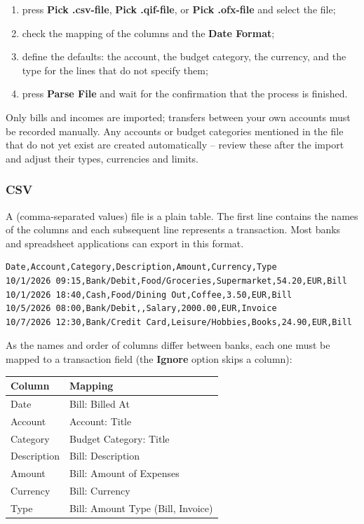 \begin{enumerate}
  \item press \textbf{Pick .csv-file}, \textbf{Pick .qif-file}, or \textbf{Pick .ofx-file}
  and select the file;
  \item check the mapping of the columns and the \textbf{Date Format};
  \item define the defaults: the account, the budget category, the currency, and the type for
  the lines that do not specify them;
  \item press \textbf{Parse File} and wait for the confirmation that the process is finished.
\end{enumerate}

\noindent Only bills and incomes are imported; transfers between your own accounts must be
recorded manually. Any accounts or budget categories mentioned in the file that do not yet
exist are created automatically -- review these after the import and adjust their types,
currencies and limits.

\subsubsection{CSV}

A  (comma-separated values) file is a plain table. The first line contains the names
of the columns and each subsequent line represents a transaction. Most banks and spreadsheet
applications can export in this format.

\begin{lstlisting}[caption=Sample CSV File, label=code:import-csv]
Date,Account,Category,Description,Amount,Currency,Type
10/1/2026 09:15,Bank/Debit,Food/Groceries,Supermarket,54.20,EUR,Bill
10/1/2026 18:40,Cash,Food/Dining Out,Coffee,3.50,EUR,Bill
10/5/2026 08:00,Bank/Debit,,Salary,2000.00,EUR,Invoice
10/7/2026 12:30,Bank/Credit Card,Leisure/Hobbies,Books,24.90,EUR,Bill
\end{lstlisting}

\noindent As the names and order of columns differ between banks, each one must be mapped to
a transaction field (the \textbf{Ignore} option skips a column):

\begin{center}
\small
\begin{tabularx}{\textwidth}{|l|X|}
  \hline
  \textbf{Column} & \textbf{Mapping} \\
  \hline
  Date & Bill: Billed At \\
  Account & Account: Title \\
  Category & Budget Category: Title \\
  Description & Bill: Description \\
  Amount & Bill: Amount of Expenses \\
  Currency & Bill: Currency \\
  Type & Bill: Amount Type (Bill, Invoice) \\
  \hline
\end{tabularx}
\end{center}

